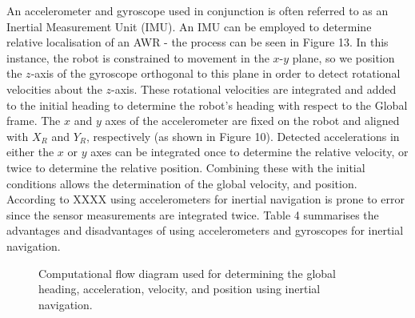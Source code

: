 \documentclass[a4paper]{article}
\begin{document}
An accelerometer and gyroscope used in conjunction is often referred to as an Inertial Measurement Unit (IMU). An IMU can be employed to determine relative localisation of an AWR - the process can be seen in Figure 13. In this instance, the robot is constrained to movement in the $x$-$y$ plane, so we position the $z$-axis of the gyroscope orthogonal to this plane in order to detect rotational velocities about the $z$-axis. These rotational velocities are integrated and added to the initial heading to determine the robot's heading with respect to the Global frame. The $x$ and $y$ axes of the accelerometer are fixed on the robot and aligned with $X_R$ and $Y_R$, respectively (as shown in Figure 10). Detected accelerations in either the $x$ or $y$ axes can be integrated once to determine the relative velocity, or twice to determine the relative position. Combining these with the initial conditions allows the determination of the global velocity, and position. According to XXXX using accelerometers for inertial navigation is prone to error since the sensor measurements are integrated twice. Table 4 summarises the advantages and disadvantages of using accelerometers and gyroscopes for inertial navigation.

\begin{figure}[h]
\centering
{}
\caption{Computational flow diagram used for determining the global heading, acceleration, velocity, and position using inertial navigation.}
\end{figure}
\end{document}
